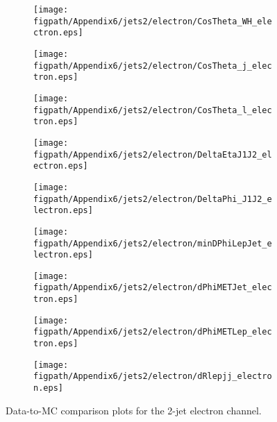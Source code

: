 \begin{figure}[!hbtp]
    \centering
    \begin{subfigure}[t]{0.317\textwidth}
        \texttt{[image: \\figpath/Appendix6/jets2/electron/CosTheta\_WH\_electron.eps]}
    \end{subfigure}
    \begin{subfigure}[t]{0.317\textwidth}
        \texttt{[image: \\figpath/Appendix6/jets2/electron/CosTheta\_j\_electron.eps]}
    \end{subfigure}
    \begin{subfigure}[t]{0.317\textwidth}
        \texttt{[image: \\figpath/Appendix6/jets2/electron/CosTheta\_l\_electron.eps]}
    \end{subfigure}

    \begin{subfigure}[t]{0.317\textwidth}
        \texttt{[image: \\figpath/Appendix6/jets2/electron/DeltaEtaJ1J2\_electron.eps]}
    \end{subfigure}
    \begin{subfigure}[t]{0.317\textwidth}
        \texttt{[image: \\figpath/Appendix6/jets2/electron/DeltaPhi\_J1J2\_electron.eps]}
    \end{subfigure}
    \begin{subfigure}[t]{0.317\textwidth}
        \texttt{[image: \\figpath/Appendix6/jets2/electron/minDPhiLepJet\_electron.eps]}
    \end{subfigure}

    \begin{subfigure}[t]{0.317\textwidth}
        \texttt{[image: \\figpath/Appendix6/jets2/electron/dPhiMETJet\_electron.eps]}
    \end{subfigure}
    \begin{subfigure}[t]{0.317\textwidth}
        \texttt{[image: \\figpath/Appendix6/jets2/electron/dPhiMETLep\_electron.eps]}
    \end{subfigure}
    \begin{subfigure}[t]{0.317\textwidth}
        \texttt{[image: \\figpath/Appendix6/jets2/electron/dRlepjj\_electron.eps]}
    \end{subfigure}
    \caption{Data-to-MC comparison plots for the 2-jet electron channel.}
    \label{fig:comparison_plots_jets2_electron_1}
\end{figure}

